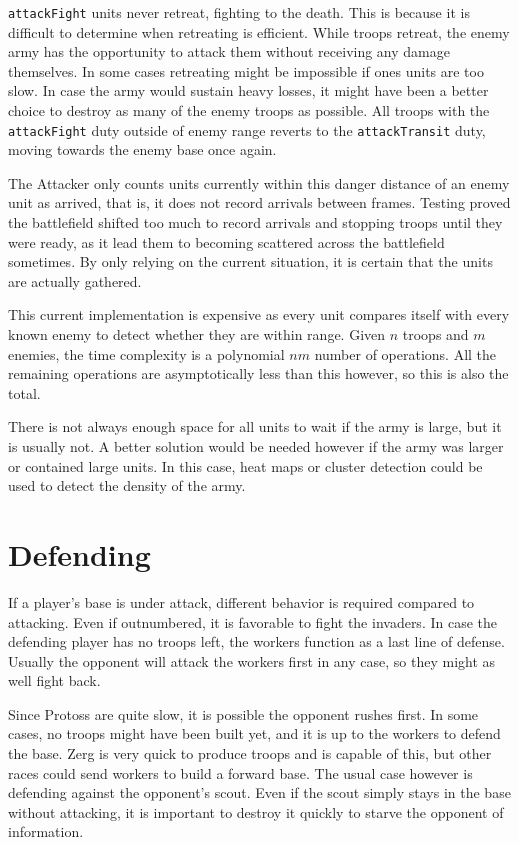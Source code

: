 	\texttt{attackFight} units never retreat, fighting to the death. This is because it is difficult to determine when retreating is efficient. While troops retreat, the enemy army has the opportunity to attack them without receiving any damage themselves. In some cases retreating might be impossible if ones units are too slow. In case the army would sustain heavy losses, it might have been a better choice to destroy as many of the enemy troops as possible. All troops with the \texttt{attackFight} duty outside of enemy range reverts to the \texttt{attackTransit} duty, moving towards the enemy base once again.
	
	The Attacker only counts units currently within this danger distance of an enemy unit as arrived, that is, it does not record arrivals between frames. Testing proved the battlefield shifted too much to record arrivals and stopping troops until they were ready, as it lead them to becoming scattered across the battlefield sometimes. By only relying on the current situation, it is certain that the units are actually gathered.
	
	This current implementation is expensive as every unit compares itself with every known enemy to detect whether they are within range. Given $n$ troops and $m$ enemies, the time complexity is a polynomial $nm$ number of operations. All the remaining operations are asymptotically less than this however, so this is also the total. 
	
	There is not always enough space for all units to wait if the army is large, but it is usually not. A better solution would be needed however if the army was larger or contained large units. In this case, heat maps or cluster detection could be used to detect the density of the army.
	
\section{Defending}
\label{sec:defending}
If a player's base is under attack, different behavior is required compared to attacking. Even if outnumbered, it is favorable to fight the invaders. In case the defending player has no troops left, the workers function as a last line of defense. Usually the opponent will attack the workers first in any case, so they might as well fight back.

Since Protoss are quite slow, it is possible the opponent rushes first. In some cases, no troops might have been built yet, and it is up to the workers to defend the base. Zerg is very quick to produce troops and is capable of this, but other races could send workers to build a forward base. The usual case however is defending against the opponent's scout. Even if the scout simply stays in the base without attacking, it is important to destroy it quickly to starve the opponent of information.

